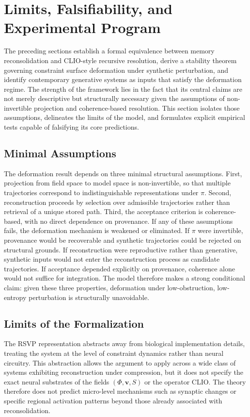 \documentclass[12pt, a4paper]{article}
\begin{document}
\section{Limits, Falsifiability, and Experimental Program}

The preceding sections establish a formal equivalence between memory reconsolidation and CLIO-style recursive resolution, derive a stability theorem governing constraint surface deformation under synthetic perturbation, and identify contemporary generative systems as inputs that satisfy the deformation regime. The strength of the framework lies in the fact that its central claims are not merely descriptive but structurally necessary given the assumptions of non-invertible projection and coherence-based resolution. This section isolates those assumptions, delineates the limits of the model, and formulates explicit empirical tests capable of falsifying its core predictions.

\subsection{Minimal Assumptions}

The deformation result depends on three minimal structural assumptions. First, projection from field space to model space is non-invertible, so that multiple trajectories correspond to indistinguishable representations under $\pi$. Second, reconstruction proceeds by selection over admissible trajectories rather than retrieval of a unique stored path. Third, the acceptance criterion is coherence-based, with no direct dependence on provenance. If any of these assumptions fails, the deformation mechanism is weakened or eliminated. If $\pi$ were invertible, provenance would be recoverable and synthetic trajectories could be rejected on structural grounds. If reconstruction were reproductive rather than generative, synthetic inputs would not enter the reconstruction process as candidate trajectories. If acceptance depended explicitly on provenance, coherence alone would not suffice for integration. The model therefore makes a strong conditional claim: given these three properties, deformation under low-obstruction, low-entropy perturbation is structurally unavoidable.

\subsection{Limits of the Formalization}

The RSVP representation abstracts away from biological implementation details, treating the system at the level of constraint dynamics rather than neural circuitry. This abstraction allows the argument to apply across a wide class of systems exhibiting reconstruction under compression, but it does not specify the exact neural substrates of the fields $(\Phi, \mathbf{v}, S)$ or the operator CLIO. The theory therefore does not predict micro-level mechanisms such as synaptic changes or specific regional activation patterns beyond those already associated with reconsolidation.
\end{document}
